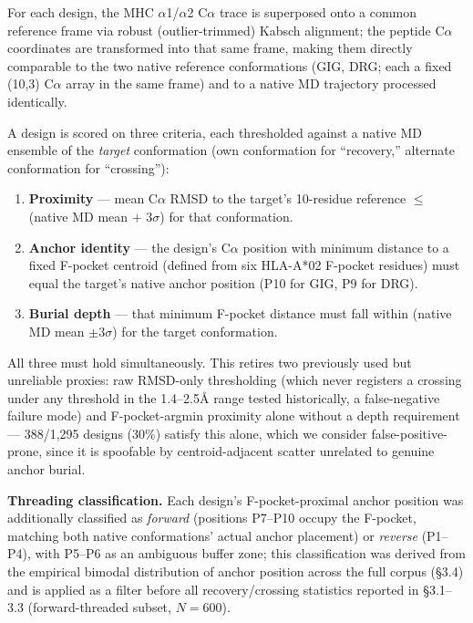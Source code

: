 \documentclass[letterpaper]{article}
\begin{document}
For each design, the MHC $\alpha$1/$\alpha$2 C$\alpha$ trace is superposed onto a common reference frame
via robust (outlier-trimmed) Kabsch alignment; the peptide C$\alpha$ coordinates are transformed into that
same frame, making them directly comparable to the two native reference conformations (GIG, DRG; each a
fixed (10,3) C$\alpha$ array in the same frame) and to a native MD trajectory processed identically.

A design is scored on three criteria, each thresholded against a native MD ensemble of the \textit{target}
conformation (own conformation for ``recovery,'' alternate conformation for ``crossing''):

\begin{enumerate}
\item \textbf{Proximity} --- mean C$\alpha$ RMSD to the target's 10-residue reference $\leq$ (native MD
  mean $+$ 3$\sigma$) for that conformation.
\item \textbf{Anchor identity} --- the design's C$\alpha$ position with minimum distance to a fixed
  F-pocket centroid (defined from six HLA-A*02 F-pocket residues) must equal the target's native anchor
  position (P10 for GIG, P9 for DRG).
\item \textbf{Burial depth} --- that minimum F-pocket distance must fall within (native MD mean
  $\pm$3$\sigma$) for the target conformation.
\end{enumerate}

All three must hold simultaneously. This retires two previously used but unreliable proxies: raw
RMSD-only thresholding (which never registers a crossing under any threshold in the 1.4--2.5\AA{} range
tested historically, a false-negative failure mode) and F-pocket-argmin proximity alone without a depth
requirement --- 388/1,295 designs (30\%) satisfy this alone, which we consider false-positive-prone, since
it is spoofable by centroid-adjacent scatter unrelated to genuine anchor burial.

\textbf{Threading classification.} Each design's F-pocket-proximal anchor position was additionally
classified as \textit{forward} (positions P7--P10 occupy the F-pocket, matching both native
conformations' actual anchor placement) or \textit{reverse} (P1--P4), with P5--P6 as an ambiguous buffer
zone; this classification was derived from the empirical bimodal distribution of anchor position across
the full corpus (\S3.4) and is applied as a filter before all recovery/crossing statistics reported in
\S3.1--3.3 (forward-threaded subset, $N=600$).
\end{document}
